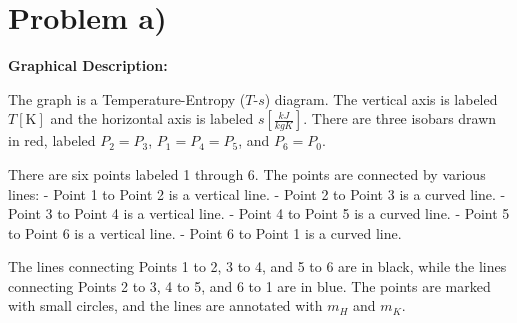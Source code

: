 \section*{Problem a)}

\begin{center}
\textbf{Graphical Description:}
\end{center}

The graph is a Temperature-Entropy ($T$-$s$) diagram. The vertical axis is labeled $T [\text{K}]$ and the horizontal axis is labeled $s [\frac{kJ}{kgK}]$. There are three isobars drawn in red, labeled $P_2 = P_3$, $P_1 = P_4 = P_5$, and $P_6 = P_0$. 

There are six points labeled 1 through 6. The points are connected by various lines:
- Point 1 to Point 2 is a vertical line.
- Point 2 to Point 3 is a curved line.
- Point 3 to Point 4 is a vertical line.
- Point 4 to Point 5 is a curved line.
- Point 5 to Point 6 is a vertical line.
- Point 6 to Point 1 is a curved line.

The lines connecting Points 1 to 2, 3 to 4, and 5 to 6 are in black, while the lines connecting Points 2 to 3, 4 to 5, and 6 to 1 are in blue. The points are marked with small circles, and the lines are annotated with $m_H$ and $m_K$.
